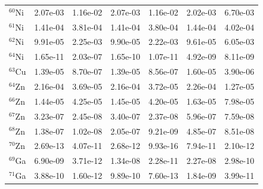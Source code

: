 \begin{table}
\begin{tabular}{l|cc|cc|cc}
$^{60}$Ni & 2.07e-03 & 1.16e-02 & 2.07e-03 & 1.16e-02 & 2.02e-03 & 6.70e-03\\
$^{61}$Ni & 1.41e-04 & 3.81e-04 & 1.41e-04 & 3.80e-04 & 1.44e-04 & 4.02e-04\\
$^{62}$Ni & 9.91e-05 & 2.25e-03 & 9.90e-05 & 2.22e-03 & 9.61e-05 & 6.05e-03\\
$^{64}$Ni & 1.65e-11 & 2.03e-07 & 1.65e-10 & 1.07e-11 & 4.92e-09 & 8.11e-09\\
$^{63}$Cu & 1.39e-05 & 8.70e-07 & 1.39e-05 & 8.56e-07 & 1.60e-05 & 3.90e-06\\
$^{64}$Zn & 2.16e-04 & 3.69e-05 & 2.16e-04 & 3.72e-05 & 2.26e-04 & 1.27e-05\\
$^{66}$Zn & 1.44e-05 & 4.25e-05 & 1.45e-05 & 4.20e-05 & 1.63e-05 & 7.98e-05\\
$^{67}$Zn & 3.23e-07 & 2.45e-08 & 3.40e-07 & 2.37e-08 & 5.96e-07 & 7.59e-08\\
$^{68}$Zn & 1.38e-07 & 1.02e-08 & 2.05e-07 & 9.21e-09 & 4.85e-07 & 8.51e-08\\
$^{70}$Zn & 2.69e-13 & 4.07e-11 & 2.68e-12 & 9.93e-16 & 7.94e-11 & 2.10e-12\\
$^{69}$Ga & 6.90e-09 & 3.71e-12 & 1.34e-08 & 2.28e-11 & 2.27e-08 & 2.98e-10\\
$^{71}$Ga & 3.88e-10 & 1.60e-12 & 9.89e-10 & 7.60e-13 & 1.84e-09 & 3.99e-11\\
\hline
\end{tabular}
\end{table}
\newpage


